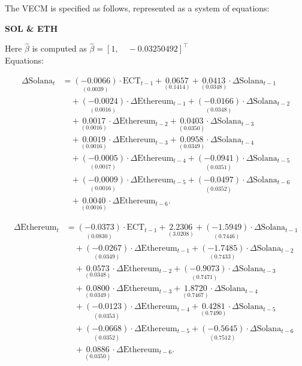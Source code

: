 \noindent The VECM is specified as follows, represented as a system of equations:\\

\begin{center}
    \textbf{SOL \& ETH}
\end{center}
Here $\hat{\beta}$ is computed as $\hat{\beta} =[1, \quad -0.03250492 ]^\top$
\\
Equations:

\begin{align*}
\Delta \text{Solana}_t &= 
\underset{(0.0039)}{(-0.0066)} \cdot \text{ECT}_{t-1} + 
\underset{(0.1414)}{0.0657} + 
\underset{(0.0348)}{0.0413} \cdot \Delta \text{Solana}_{t-1} \\
&\quad + \underset{(0.0016)}{(-0.0024)} \cdot \Delta \text{Ethereum}_{t-1} + 
\underset{(0.0348)}{(-0.0166)} \cdot \Delta \text{Solana}_{t-2} \\
&\quad + \underset{(0.0016)}{0.0017} \cdot \Delta \text{Ethereum}_{t-2} + 
\underset{(0.0350)}{0.0403} \cdot \Delta \text{Solana}_{t-3} \\
&\quad + \underset{(0.0016)}{0.0019} \cdot \Delta \text{Ethereum}_{t-3} + 
\underset{(0.0349)}{0.0958} \cdot \Delta \text{Solana}_{t-4} \\
&\quad + \underset{(0.0017)}{(-0.0005)} \cdot \Delta \text{Ethereum}_{t-4} + 
\underset{(0.0351)}{(-0.0941)} \cdot \Delta \text{Solana}_{t-5} \\
&\quad + \underset{(0.0016)}{(-0.0009)} \cdot \Delta \text{Ethereum}_{t-5} + 
\underset{(0.0352)}{(-0.0497)} \cdot \Delta \text{Solana}_{t-6} \\
&\quad + \underset{(0.0016)}{0.0040} \cdot \Delta \text{Ethereum}_{t-6}.
\end{align*}

\begin{align*}
\Delta \text{Ethereum}_t &= 
\underset{(0.0830)}{(-0.0373)} \cdot \text{ECT}_{t-1} + 
\underset{(3.0208)}{2.2306} + 
\underset{(0.7446)}{(-1.5949)} \cdot \Delta \text{Solana}_{t-1} \\
&\quad + \underset{(0.0349)}{(-0.0267)} \cdot \Delta \text{Ethereum}_{t-1} + 
\underset{(0.7433)}{(-1.7485)} \cdot \Delta \text{Solana}_{t-2} \\
&\quad + \underset{(0.0348)}{0.0573} \cdot \Delta \text{Ethereum}_{t-2} + 
\underset{(0.7471)}{(-0.9073)} \cdot \Delta \text{Solana}_{t-3} \\
&\quad + \underset{(0.0349)}{0.0800} \cdot \Delta \text{Ethereum}_{t-3} + 
\underset{(0.7467)}{1.8720} \cdot \Delta \text{Solana}_{t-4} \\
&\quad + \underset{(0.0353)}{(-0.0123)} \cdot \Delta \text{Ethereum}_{t-4} + 
\underset{(0.7490)}{0.4281} \cdot \Delta \text{Solana}_{t-5} \\
&\quad + \underset{(0.0352)}{(-0.0668)} \cdot \Delta \text{Ethereum}_{t-5} + 
\underset{(0.7512)}{(-0.5645)} \cdot \Delta \text{Solana}_{t-6} \\
&\quad + \underset{(0.0350)}{0.0886} \cdot \Delta \text{Ethereum}_{t-6}.
\end{align*}

